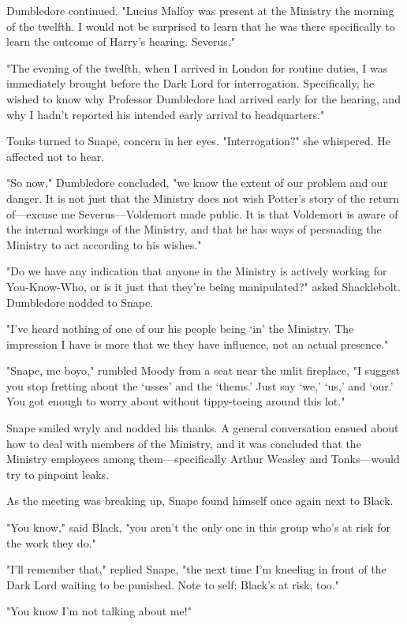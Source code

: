 Dumbledore continued. "Lucius Malfoy was present at the Ministry the morning of the twelfth. I would not be surprised to learn that he was there specifically to learn the outcome of Harry's hearing. Severus."

"The evening of the twelfth, when I arrived in{\el} London for routine duties, I was immediately brought before the Dark Lord for interrogation. Specifically, he wished to know why Professor Dumbledore had arrived early for the hearing, and why I hadn't reported his intended early arrival to headquarters."

Tonks turned to Snape, concern in her eyes. "Interrogation?" she whispered. He affected not to hear.

"So now," Dumbledore concluded, "we know the extent of our problem and our danger. It is not just that the Ministry does not wish Potter's story of the return of—excuse me Severus—Voldemort made public. It is that Voldemort is aware of the internal workings of the Ministry, and that he has ways of persuading the Ministry to act according to his wishes."

"Do we have any indication that anyone in the Ministry is actively working for You-Know-Who, or is it just that they're being manipulated?" asked Shacklebolt. Dumbledore nodded to Snape.

"I've heard nothing of one of our{\el} his people being `in' the Ministry. The impression I have is more that we{\el} they have influence, not an actual presence."

"Snape, me boyo," rumbled Moody from a seat near the unlit fireplace, "I suggest you stop fretting about the `usses' and the `thems.' Just say `we,' `us,' and `our.' You got enough to worry about without tippy-toeing around this lot."

Snape smiled wryly and nodded his thanks. A general conversation ensued about how to deal with members of the Ministry, and it was concluded that the Ministry employees among them—specifically Arthur Weasley and Tonks—would try to pinpoint leaks.

As the meeting was breaking up, Snape found himself once again next to Black.

"You know," said Black, "you aren't the only one in this group who's at risk for the work they do."

"I'll remember that," replied Snape, "the next time I'm kneeling in front of the Dark Lord waiting to be punished. Note to self: Black's at risk, too."

"You know I'm not talking about me!"

